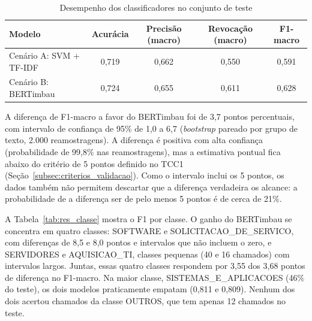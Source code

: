 \documentclass[
    12pt,                %
    openright,           %
    oneside,             %
    a4paper,             %
    english,             %
    brazil               %
]{abntex2}
\begin{document}
\begin{table}[htb]
  \centering
  \caption{Desempenho dos classificadores no conjunto de teste}
  \label{tab:res_teste}
  \begin{tabular}{lcccc}
    \toprule
    Modelo & Acurácia & Precisão (macro) & Revocação (macro) & F1-macro \\
    \midrule
    Cenário A: SVM + TF-IDF & 0,719 & 0,662 & 0,550 & 0,591 \\
    Cenário B: BERTimbau & 0,724 & 0,655 & 0,611 & 0,628 \\
    \bottomrule
  \end{tabular}
\end{table}

A diferença de F1-macro a favor do BERTimbau foi de 3,7 pontos percentuais, com intervalo de confiança de 95\% de 1,0 a 6,7 (\textit{bootstrap} pareado por grupo de texto, 2.000 reamostragens). A diferença é positiva com alta confiança (probabilidade de 99,8\% nas reamostragens), mas a estimativa pontual fica abaixo do critério de 5 pontos definido no TCC1 (Seção~\ref{subsec:criterios_validacao}). Como o intervalo inclui os 5 pontos, os dados também não permitem descartar que a diferença verdadeira os alcance: a probabilidade de a diferença ser de pelo menos 5 pontos é de cerca de 21\%.

A Tabela~\ref{tab:res_classe} mostra o F1 por classe. O ganho do BERTimbau se concentra em quatro classes: SOFTWARE e SOLICITACAO\_DE\_SERVICO, com diferenças de 8,5 e 8,0 pontos e intervalos que não incluem o zero, e SERVIDORES e AQUISICAO\_TI, classes pequenas (40 e 16 chamados) com intervalos largos. Juntas, essas quatro classes respondem por 3,55 dos 3,68 pontos de diferença no F1-macro. Na maior classe, SISTEMAS\_E\_APLICACOES (46\% do teste), os dois modelos praticamente empatam (0,811 e 0,809). Nenhum dos dois acertou chamados da classe OUTROS, que tem apenas 12 chamados no teste.
\end{document}

